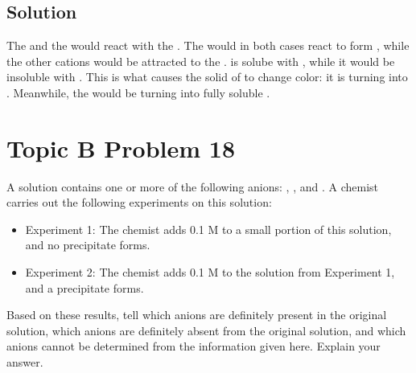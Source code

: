 \documentclass[10pt]{article}
\begin{document}
        \subsection{Solution}
            The  and the  would react with the .
            The  would in both cases react to form , while the other cations would be attracted to the .
             is solube with , while it would be insoluble with . 
            This is what causes the solid of  to change color: it is turning into . 
            Meanwhile, the  would be turning into fully soluble .

    \pagebreak
    \section{Topic B Problem 18}
        A solution contains one or more of the following anions: , , and . 
        A chemist carries out the following experiments on this solution:
        \begin{itemize}
            \item Experiment 1: The chemist adds 0.1 M  to a small portion of this solution, and no precipitate forms.
            \item Experiment 2: The chemist adds 0.1 M  to the solution from Experiment 1, and a precipitate forms.
        \end{itemize}
        Based on these results, tell which anions are definitely present in the original solution, which anions are definitely absent from the original solution, and which anions cannot be determined from the information given here. 
        Explain your answer.
\end{document}
